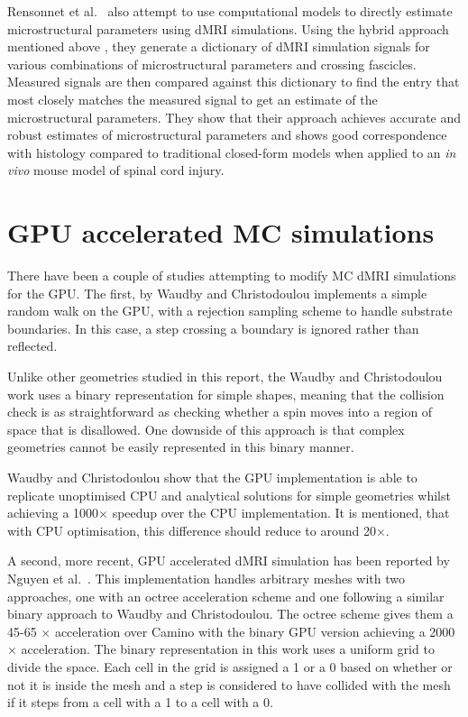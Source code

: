 Rensonnet et al.\ \cite{Rensonnet2018} also attempt to use computational models to directly estimate microstructural parameters using \ac{dMRI} simulations.
Using the hybrid approach mentioned above \cite{Rensonnet2015}, they generate a dictionary of \ac{dMRI} simulation signals for various combinations of microstructural parameters and crossing fascicles.
Measured signals are then compared against this dictionary to find the entry that most closely matches the measured signal to get an estimate of the microstructural parameters.
They show that their approach achieves accurate and robust estimates of microstructural parameters and shows good correspondence with histology compared to traditional closed-form models when applied to an \emph{in vivo} mouse model of spinal cord injury. 



\section{\ac{GPU} accelerated \ac{MC} simulations}
\label{sec:review_gpu}
There have been a couple of studies attempting to modify \ac{MC} \ac{dMRI} simulations for the \ac{GPU}.
The first, by Waudby and Christodoulou \cite{Waudby2011} implements a simple random walk on the \ac{GPU}, with a rejection sampling scheme to handle substrate boundaries.
In this case, a step crossing a boundary is ignored rather than reflected.

Unlike other geometries studied in this report, the Waudby and Christodoulou work uses a binary representation for simple shapes, meaning that the collision check is as straightforward as checking whether a spin moves into a region of space that is disallowed.
One downside of this approach is that complex geometries cannot be easily represented in this binary manner.

Waudby and Christodoulou show that the \ac{GPU} implementation is able to replicate unoptimised \ac{CPU} and analytical solutions for simple geometries whilst achieving a 1000$\times$ speedup over the \ac{CPU} implementation.
It is mentioned, that with \ac{CPU} optimisation, this difference should reduce to around 20$\times$.

A second, more recent, \ac{GPU} accelerated \ac{dMRI} simulation has been reported by Nguyen et al.\ \cite{Nguyen2018}.
This implementation handles arbitrary meshes with two approaches, one with an octree acceleration scheme and one following a similar binary approach to Waudby and Christodoulou.
The octree scheme gives them a 45-65 $\times$ acceleration over Camino with the binary \ac{GPU} version achieving a 2000 $\times$ acceleration.
The binary representation in this work uses a uniform grid to divide the space.
Each cell in the grid is assigned a 1 or a 0 based on whether or not it is inside the mesh and a step is considered to have collided with the mesh if it steps from a cell with a 1 to a cell with a 0.

